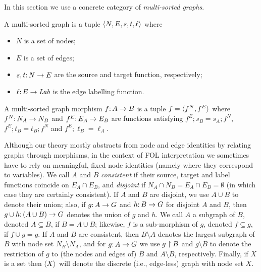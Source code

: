 In this section we use a concrete category of \emph{multi-sorted graphs}.
%
\begin{definition}
A multi-sorted graph is a tuple $\langle N,E,s,t,\ell\rangle$ where
\begin{itemize}
\item $N$ is a set of nodes;
\item $E$ is a set of edges;
\item $s,t{:}\, N\rightarrow E$ are the source and target function, respectively;
\item $\ell{:}\, E\rightarrow \mathit{Lab}$ is the edge labelling function.
\end{itemize}
A multi-sorted graph morphism $f{:}\, A\rightarrow B$ is a tuple $f=\langle f^N,f^E\rangle$ where $f^N{:}\, N_A\rightarrow N_B$ and $f^E{:}\, E_A\rightarrow E_B$ are functions satisfying $f^E;s_B=s_A;f^N$, $f^E;t_B=t_B;f^N$ and $f^E;\ell_B=\ell_A$.
\end{definition}
%
Although our theory mostly abstracts from node and edge identities by relating graphs through morphisms, in the context of FOL interpretation we sometimes have to rely on meaningful, fixed node identities (namely where they correspond to variables). We call $A$ and $B$ \emph{consistent} if their source, target and label functions coincide on $E_A\cap E_B$, and \emph{disjoint} if $N_A\cap N_B=E_A\cap E_B=\emptyset$ (in which case they are certainly consistent).  If $A$ and $B$ are disjoint, we use $A\cup B$ to denote their union; also, if $g{:}\, A\rightarrow G$ and $h{:}\, B\rightarrow G$ for disjoint $A$ and $B$, then $g\cup h{:}\, (A\cup B)\rightarrow G$ denotes the union of $g$ and $h$. We call $A$ a subgraph of $B$, denoted $A\subseteq B$, if $B=A\cup B$; likewise, $f$ is a sub-morphism of $g$, denoted $f\subseteq g$, if $f\cup g=g$. If $A$ and $B$ are consistent, then $B\setminus A$ denotes the largest subgraph of $B$ with node set $N_B\setminus N_A$, and for $g{:}\, A\rightarrow G$ we use $g\restriction B$ and $g\setminus B$ to denote the restriction of $g$ to (the nodes and edges of) $B$ and $A\setminus B$, respectively. Finally, if $X$ is a set then $\langle X\rangle$ will denote the discrete (i.e., edge-less) graph with node set $X$.


